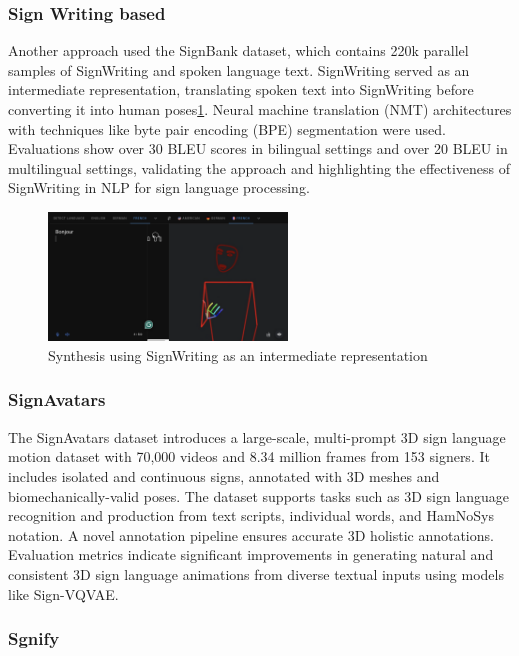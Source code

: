 \documentclass[../../main.tex]{subfiles}
\begin{document}
\subsubsection{Sign Writing based}

Another approach\cite{TODO} used the SignBank dataset, which contains 220k parallel samples of SignWriting and spoken language text. SignWriting served as an intermediate representation, translating spoken text into SignWriting before converting it into human poses\ref{fig:sw_synthesis}. Neural machine translation (NMT) architectures with techniques like byte pair encoding (BPE) segmentation were used. Evaluations show over 30 BLEU scores in bilingual settings and over 20 BLEU in multilingual settings, validating the approach and highlighting the effectiveness of SignWriting in NLP for sign language processing.

\begin{figure}
  \centering \includegraphics[width = 2.5in]{chapters/background_work/images/sign_writing_synthesis.png}
  \caption{Synthesis using SignWriting as an intermediate representation}
  \label{fig:sw_synthesis}
\end{figure}

\subsubsection{SignAvatars}

The SignAvatars dataset introduces a large-scale, multi-prompt 3D sign language motion dataset with 70,000 videos and 8.34 million frames from 153 signers. It includes isolated and continuous signs, annotated with 3D meshes and biomechanically-valid poses. The dataset supports tasks such as 3D sign language recognition and production from text scripts, individual words, and HamNoSys notation. A novel annotation pipeline ensures accurate 3D holistic annotations. Evaluation metrics indicate significant improvements in generating natural and consistent 3D sign language animations from diverse textual inputs using models like Sign-VQVAE.

\subsubsection{Sgnify}
\end{document}
